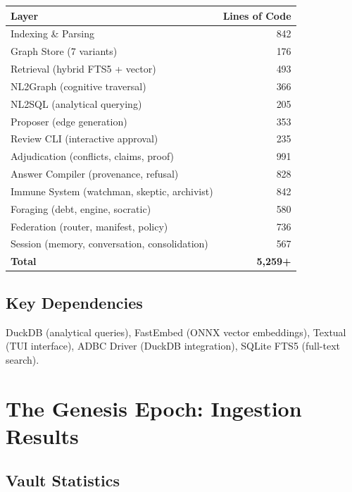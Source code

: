 \documentclass[12pt,a4paper]{article}
\begin{document}
\begin{center}
\begin{tabular}{lr}
\textbf{Layer} & \textbf{Lines of Code} \\
\hline
Indexing \& Parsing & 842 \\
Graph Store (7 variants) & 176 \\
Retrieval (hybrid FTS5 + vector) & 493 \\
NL2Graph (cognitive traversal) & 366 \\
NL2SQL (analytical querying) & 205 \\
Proposer (edge generation) & 353 \\
Review CLI (interactive approval) & 235 \\
Adjudication (conflicts, claims, proof) & 991 \\
Answer Compiler (provenance, refusal) & 828 \\
Immune System (watchman, skeptic, archivist) & 842 \\
Foraging (debt, engine, socratic) & 580 \\
Federation (router, manifest, policy) & 736 \\
Session (memory, conversation, consolidation) & 567 \\
\hline
\textbf{Total} & \textbf{5,259+} \\
\end{tabular}
\end{center}

\subsection{Key Dependencies}

DuckDB (analytical queries), FastEmbed (ONNX vector embeddings),
Textual (TUI interface), ADBC Driver (DuckDB integration), SQLite
FTS5 (full-text search).

\clearpage

\section{The Genesis Epoch: Ingestion Results}

\subsection{Vault Statistics}
\end{document}
